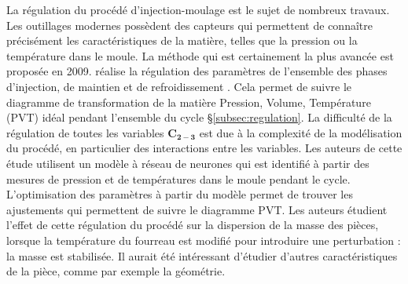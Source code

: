La régulation du procédé d'injection-moulage est le  sujet de nombreux travaux.
Les outillages modernes possèdent des capteurs qui permettent de connaître précisément les caractéristiques de la matière, telles que la pression ou la température dans le moule.
La méthode qui est certainement la plus avancée est proposée en 2009.
\citeauthor{michaeli_online_2009} réalise la régulation des paramètres de l'ensemble des phases d'injection, de maintien et de refroidissement \cite{michaeli_online_2009}.
Cela permet de suivre le diagramme de transformation de la matière Pression, Volume, Température (PVT) idéal pendant l'ensemble du cycle §\ref{subsec:regulation}.
La difficulté de la régulation de toutes les variables $\boldsymbol{C_{2-3}}$ est due à la complexité de la modélisation du procédé, en particulier des interactions entre les variables.
Les auteurs de cette étude utilisent un modèle à réseau de neurones qui est identifié à partir des mesures de pression et de températures dans le moule pendant le cycle.
L'optimisation des paramètres à partir du modèle permet de trouver les ajustements qui permettent de suivre le diagramme PVT.
Les auteurs étudient l'effet de cette régulation du procédé sur la dispersion de la masse des pièces, lorsque la température du fourreau est modifié pour introduire une perturbation : la masse est stabilisée.
Il aurait été intéressant d'étudier d'autres caractéristiques de la pièce, comme par exemple la géométrie.

